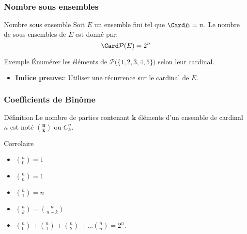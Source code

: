 \begin{frame}[t]
  \frametitle{Nombre sous ensembles}
 \begin{block}{Nombre sous ensemble}
   Soit $E$ un ensemble fini tel que $\Card E = n$. 
   Le nombre de sous ensembles de $E$  est donné par:
   \begin{equation}
     \Card \mathcal{P}(E) = 2^n
   \end{equation}
 \end{block} 
 \pause
 \begin{block}{Exemple}
   Énumérer les éléments de $\mathcal{P}\big( \{1,2,3,4,5\}\big)$ selon leur
   cardinal.
 \end{block}
 \begin{itemize}
   \item \textbf{\alert{Indice preuve:}}: Utiliser une récurrence sur le
     cardinal de $E$.
 \end{itemize}
\end{frame}


\begin{frame}[t]
  \frametitle{Coefficients de Binôme}
  \begin{block}{Définition}
  Le nombre de parties contenant $\mathbf{k}$ éléments d'un ensemble de cardinal
  $n$ est noté $\mathbf{\binom{n}{k}}$ ou $C^{n}_{k}$.
  \end{block}
  \pause
  \begin{block}{Corrolaire}
    \begin{itemize}
      \item $\binom{n}{0} = 1$\\[8pt]\pause
      \item $\binom{n}{n} = 1$\\[8pt]\pause
      \item $\binom{n}{1} = n$\\[8pt]\pause
      \item $\binom{n}{k} = \binom{n}{n-k}$\\[8pt]\pause
      \item $\binom{n}{0}+\binom{n}{1}+\binom{n}{2}+\ldots \binom{n}{n}=2^n$.\pause
    \end{itemize}
  \end{block}
\end{frame}

